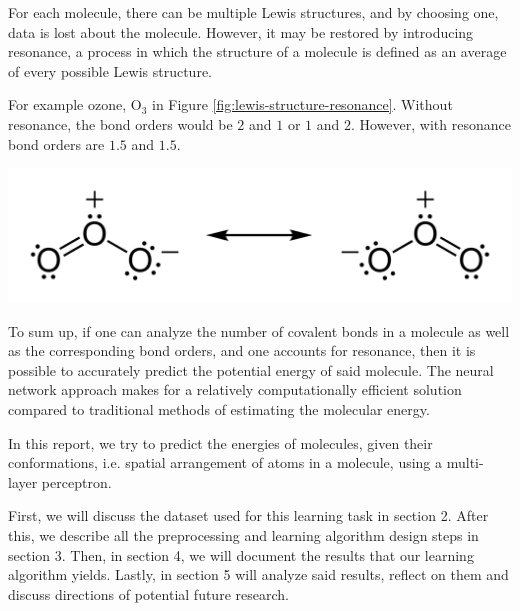 For each molecule, there can be multiple Lewis structures, and by choosing one, data is lost about the molecule. However, it may be restored by introducing resonance, a process in which the structure of a molecule is defined as an average of every possible Lewis structure.

For example ozone, $\text{O}_3$ in Figure \ref{fig:lewis-structure-resonance}. Without resonance, the bond orders would be $2$ and $1$ or $1$ and $2$. However, with resonance bond orders are $1.5$ and $1.5$.

\begin{Figure}
    \centering
    \includegraphics[width=.8\linewidth]{images/ozone-lewis-structures.png}
    \captionsetup{width=.9\linewidth}
    \label{fig:lewis-structure-resonance}
\end{Figure}

To sum up, if one can analyze the number of covalent bonds in a molecule as well as the corresponding bond orders, and one accounts for resonance, then it is possible to accurately predict the potential energy of said molecule. The neural network approach makes for a relatively computationally efficient solution compared to traditional methods of estimating the molecular energy.

In this report, we try to predict the energies of molecules, given their conformations, i.e. spatial arrangement of atoms in a molecule, using a multi-layer perceptron.


First, we will discuss the dataset used for this learning task in section 2. After this, we describe all the preprocessing and learning algorithm design steps in section 3. Then, in section 4, we will document the results that our learning algorithm yields. Lastly, in section 5 will analyze said results, reflect on them and discuss directions of potential future research.


